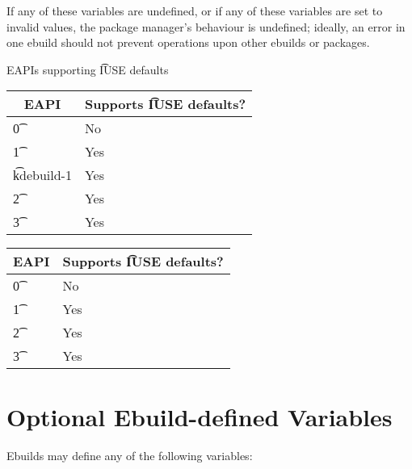 If any of these variables are undefined, or if any of these variables are set to invalid values,
the package manager's behaviour is undefined; ideally, an error in one ebuild should not prevent
operations upon other ebuilds or packages.

\begin{centertable}{EAPIs supporting \t{IUSE} defaults} \label{tab:iuse-defaults-table}
\IFKDEBUILDELSE
{
    \begin{tabular}{ l l }
        \toprule
        \multicolumn{1}{c}{\textbf{EAPI}} &
        \multicolumn{1}{c}{\textbf{Supports \t{IUSE} defaults?}} \\
        \midrule
    \t{0} & No \\
    \t{1} & Yes \\
    \t{kdebuild-1} & Yes \\
    \t{2} & Yes \\
    \t{3} & Yes \\
    \bottomrule
    \end{tabular}
}
{
    \begin{tabular}{ l l }
        \toprule
        \multicolumn{1}{c}{\textbf{EAPI}} &
        \multicolumn{1}{c}{\textbf{Supports \t{IUSE} defaults?}} \\
        \midrule
    \t{0} & No \\
    \t{1} & Yes \\
    \t{2} & Yes \\
    \t{3} & Yes \\
    \bottomrule
    \end{tabular}
}
\end{centertable}

\section{Optional Ebuild-defined Variables}

Ebuilds may define any of the following variables:

